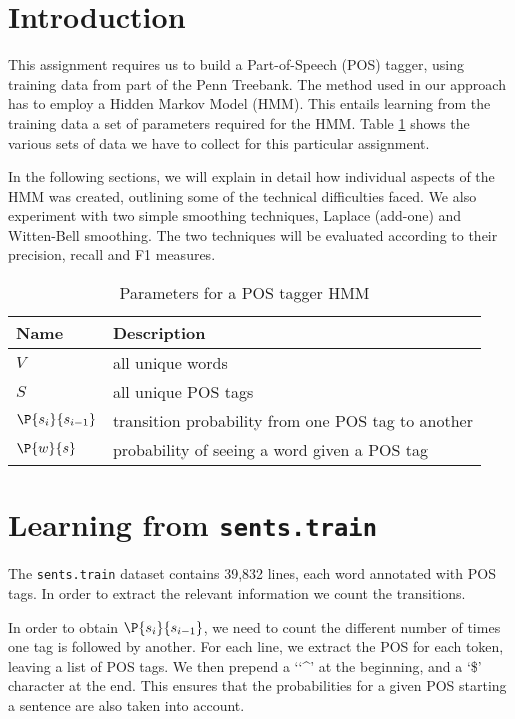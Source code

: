 \documentclass[12pt]{homework}
\title{}
\author{}
\date{}
\newcommand{\transprob}{\P{s_i}{s_{i-1}}}
\newcommand{\obsprob}{\P{w}{s}}
\begin{document}
\maketitle
{}
\section{Introduction}

This assignment requires us to build a Part-of-Speech (POS) tagger, using 
training data from part of the Penn Treebank. The method used in our approach 
has to employ a Hidden Markov Model (HMM). This entails learning from the 
training data a set of parameters required for the HMM. Table \ref{parameters} 
shows the various sets of data we have to collect for this particular 
assignment.

In the following sections, we will explain in detail how individual aspects of 
the HMM was created, outlining some of the technical difficulties faced. We also  
experiment with two simple smoothing techniques, Laplace (add-one) and 
Witten-Bell smoothing. The two techniques will be evaluated according to their 
precision, recall and F1 measures.

\begin{table}
	\begin{center}
	\begin{tabular}{l l}
		\hline
		Name			&	Description\\
		\hline
		$V$				&	all unique words\\
		$S$				&	all unique POS tags\\
		$\transprob$	&	transition probability from one POS tag to another\\
		$\obsprob$		&	probability of seeing a word given a POS tag\\
		\hline
	\end{tabular}
	\end{center}
	\label{parameters}\caption{Parameters for a POS tagger HMM}
\end{table}
\section{Learning from \texttt{sents.train}}
The \texttt{sents.train} dataset contains 39,832 lines, each word annotated with 
POS tags. In order to extract the relevant information we count the transitions.

In order to obtain $\transprob$, we need to count the different number of times 
one tag is followed by another. For each line, we extract the POS for each 
token, leaving a list of POS tags. We then prepend a `{\char`\^}' at the 
beginning, and a `\$' character at the end. This ensures that the probabilities 
for a given POS starting a sentence are also taken into account.
\end{document}
